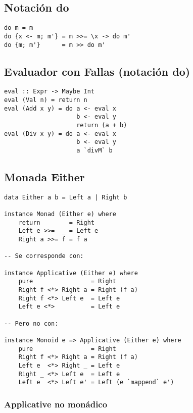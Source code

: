 \documentclass{article}
\begin{document}
\subsection{Notación do}


\begin{lstlisting}
do m = m
do {x <- m; m'} = m >>= \x -> do m'
do {m; m'}      = m >> do m'
\end{lstlisting}

\subsection{Evaluador con Fallas (notación do)}

\begin{lstlisting}
eval :: Expr -> Maybe Int
eval (Val n) = return n
eval (Add x y) = do a <- eval x
                    b <- eval y
                    return (a + b)
eval (Div x y) = do a <- eval x
                    b <- eval y
                    a `divM` b
\end{lstlisting}

\newpage

\subsection{Monada Either}

\begin{lstlisting}
data Either a b = Left a | Right b

instance Monad (Either e) where
    return        = Right
    Left e >>=  _ = Left e
    Right a >>= f = f a

-- Se corresponde con:

instance Applicative (Either e) where
    pure                = Right
    Right f <*> Right a = Right (f a)
    Right f <*> Left e  = Left e
    Left e <*>          = Left e

-- Pero no con:

instance Monoid e => Applicative (Either e) where
    pure                = Right
    Right f <*> Right a = Right (f a)
    Left e  <*> Right _ = Left e
    Right _ <*> Left e  = Left e
    Left e  <*> Left e' = Left (e `mappend` e')

\end{lstlisting}

\subsubsection{Applicative no monádico}
\end{document}
